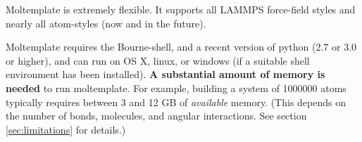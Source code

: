 \documentclass[11pt]{article}
\begin{document}
Moltemplate is extremely flexible.
It supports all LAMMPS force-field styles and nearly all atom-styles
(now and in the future).




Moltemplate requires the Bourne-shell, and a recent version of python (2.7 or 3.0 or higher), and can run on OS X, linux, or windows (if a suitable shell environment has been installed).  
\textbf{A substantial amount of memory is needed} to run moltemplate.
For example, building a system of 1000000 atoms typically requires 
between 3 and 12 GB of \textit{available} memory.
(This depends on the number of bonds, molecules, and angular interactions.
 See section \ref{sec:limitations} for details.)

\end{document}

